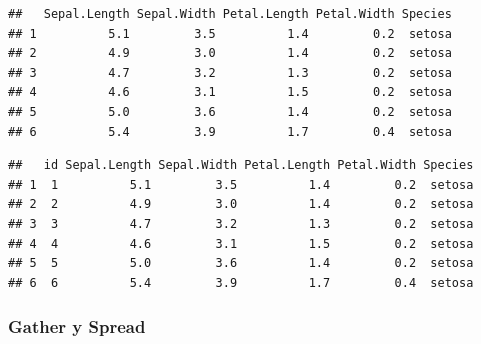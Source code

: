 \documentclass[]{book}
\newenvironment{Shaded}{\begin{snugshade}}{\end{snugshade}}
\newcommand{\CommentTok}[1]{\textcolor[rgb]{0.56,0.35,0.01}{\textit{#1}}}
\newcommand{\DataTypeTok}[1]{\textcolor[rgb]{0.13,0.29,0.53}{#1}}
\newcommand{\DecValTok}[1]{\textcolor[rgb]{0.00,0.00,0.81}{#1}}
\newcommand{\KeywordTok}[1]{\textcolor[rgb]{0.13,0.29,0.53}{\textbf{#1}}}
\newcommand{\NormalTok}[1]{#1}
\newcommand{\OperatorTok}[1]{\textcolor[rgb]{0.81,0.36,0.00}{\textbf{#1}}}
\newcommand{\StringTok}[1]{\textcolor[rgb]{0.31,0.60,0.02}{#1}}
\begin{document}
\begin{verbatim}
##   Sepal.Length Sepal.Width Petal.Length Petal.Width Species
## 1          5.1         3.5          1.4         0.2  setosa
## 2          4.9         3.0          1.4         0.2  setosa
## 3          4.7         3.2          1.3         0.2  setosa
## 4          4.6         3.1          1.5         0.2  setosa
## 5          5.0         3.6          1.4         0.2  setosa
## 6          5.4         3.9          1.7         0.4  setosa
\end{verbatim}

\begin{Shaded}
\end{Shaded}

\begin{verbatim}
##   id Sepal.Length Sepal.Width Petal.Length Petal.Width Species
## 1  1          5.1         3.5          1.4         0.2  setosa
## 2  2          4.9         3.0          1.4         0.2  setosa
## 3  3          4.7         3.2          1.3         0.2  setosa
## 4  4          4.6         3.1          1.5         0.2  setosa
## 5  5          5.0         3.6          1.4         0.2  setosa
## 6  6          5.4         3.9          1.7         0.4  setosa
\end{verbatim}

\hypertarget{gather-y-spread}{%
\subsubsection{Gather y Spread}\label{gather-y-spread}}

\begin{Shaded}
\end{Shaded}
\end{document}
